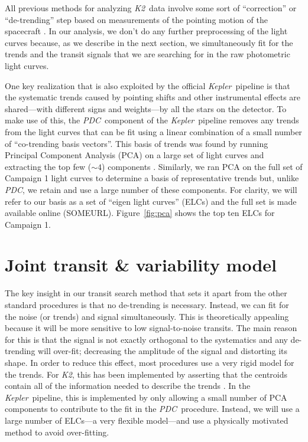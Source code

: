 \documentclass[12pt,preprint]{aastex}
\newcommand{\project}[1]{\textsl{#1}} %
\newcommand{\kepler}{\project{Kepler}}
\newcommand{\KT}{\project{K2}}
\newcommand{\pdc}{\project{PDC}}
\newcommand{\figref}[1]{\ref{fig:#1}}
\newcommand{\Fig}[1]{Figure~\figref{#1}}
\newcommand{\sectlabel}[1]{\label{sect:#1}}
\begin{document}
All previous methods for analyzing \KT\ data involve some sort of
``correction'' or ``de-trending'' step based on measurements of the pointing
motion of the spacecraft \citep{Vanderburg:2014, Aigrain:2015,
Crossfield:2015}.
In our analysis, we don't do any further preprocessing of the light curves
because, as we describe in the next section, we simultaneously fit for the
trends and the transit signals that we are searching for in the raw
photometric light curves.

One key realization that is also exploited by the official \kepler\ pipeline
is that the systematic trends caused by pointing shifts and other instrumental
effects are shared---with different signs and weights---by all the stars on
the detector.
To make use of this, the \pdc\ component of the \kepler\ pipeline
removes any trends from the light curves that can be fit using a linear
combination of a small number of ``co-trending basis vectors''.
This basis of trends was found by running Principal Component Analysis (PCA)
on a large set of light curves and extracting the top few ($\sim 4$)
components \citep{pdc1, pdc2}.
Similarly, we ran PCA on the full set of Campaign 1 light curves to determine
a basis of representative trends but, unlike \pdc, we retain and use
a large number of these components.
For clarity, we will refer to our basis as a set of ``eigen light curves''
(ELCs) and the full set is made available online (SOMEURL).
\Fig{pca} shows the top ten ELCs for Campaign 1.


\section{Joint transit \& variability model}
\sectlabel{model}

The key insight in our transit search method that sets it apart from the
other standard procedures is that no de-trending is necessary.
Instead, we can fit for the noise (or trends) and signal simultaneously.
This is theoretically appealing because it will be more sensitive to low
signal-to-noise transits.
The main reason for this is that the signal is not exactly orthogonal to the
systematics and any de-trending will over-fit; decreasing the amplitude of the
signal and distorting its shape.
In order to reduce this effect, most procedures use a very rigid model for
the trends.
For \KT, this has been implemented by asserting that the centroids contain
all of the information needed to describe the trends \citep{Vanderburg:2014,
Aigrain:2015, Crossfield:2015}.
In the \kepler\ pipeline, this is implemented by only allowing a small number
of PCA components to contribute to the fit in the \pdc\ procedure.
Instead, we will use a large number of ELCs---a very flexible model---and
use a physically motivated method to avoid over-fitting.
\end{document}
